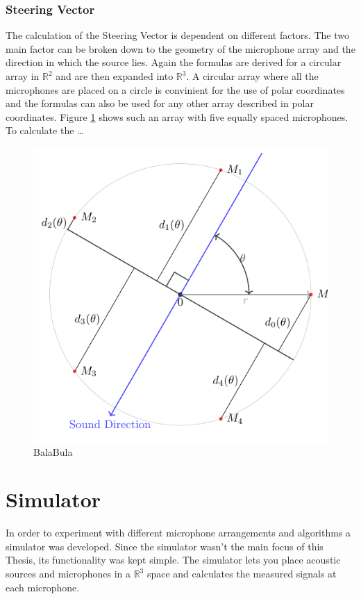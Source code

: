 \subsubsection{Steering Vector}
The calculation of the Steering Vector is dependent on different factors.
The two main factor can be broken down to the geometry of the microphone array
and the direction in which the source lies. 
Again the formulas are derived for a circular array in $\mathbb{R}^2$ and are then expanded into $\mathbb{R}^3$.
A circular array where all the microphones are 
placed on a circle is convinient for the use of polar coordinates and the 
formulas can also be used for any other array described in polar coordinates.
Figure \ref*{ssl:fig:steering} shows such an array with five equally spaced microphones.
To calculate the \dots
\begin{figure}
  \centering
  \includegraphics[]{steering_vector.pdf}
  \caption{BalaBula}
  \label{ssl:fig:steering}
\end{figure}


\newpage
\section{Simulator}
In order to experiment with different microphone arrangements and algorithms a simulator was developed.
Since the simulator wasn't the main focus of this Thesis, its functionality was kept simple.
The simulator lets you place acoustic sources and microphones in a $\mathbb{R}^3$ space and calculates
the measured signals at each microphone.

